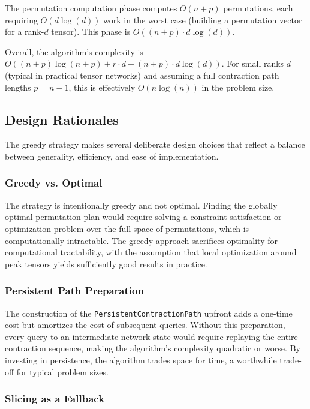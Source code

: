 The permutation computation phase computes $O(n + p)$ permutations, each requiring $O(d \log(d))$ work in the worst case (building a permutation vector for a rank-$d$ tensor). This phase is $O((n + p) \cdot d \log (d))$.

Overall, the algorithm's complexity is $O((n + p) \log(n + p) + r \cdot d + (n + p) \cdot d \log(d))$. For small ranks $d$ (typical in practical tensor networks) and assuming a full contraction path lengths $p = n - 1$, this is effectively $O(n \log(n))$ in the problem size.

\subsection{Design Rationales}

The greedy strategy makes several deliberate design choices that reflect a balance between generality, efficiency, and ease of implementation.

\subsubsection{Greedy vs. Optimal}

The strategy is intentionally greedy and not optimal. Finding the globally optimal permutation plan would require solving a constraint satisfaction or optimization problem over the full space of permutations, which is computationally intractable. The greedy approach sacrifices optimality for computational tractability, with the assumption that local optimization around peak tensors yields sufficiently good results in practice.

\subsubsection{Persistent Path Preparation}

The construction of the \texttt{PersistentContractionPath} upfront adds a one-time cost but amortizes the cost of subsequent queries. Without this preparation, every query to an intermediate network state would require replaying the entire contraction sequence, making the algorithm's complexity quadratic or worse. By investing in persistence, the algorithm trades space for time, a worthwhile trade-off for typical problem sizes.

\subsubsection{Slicing as a Fallback}


